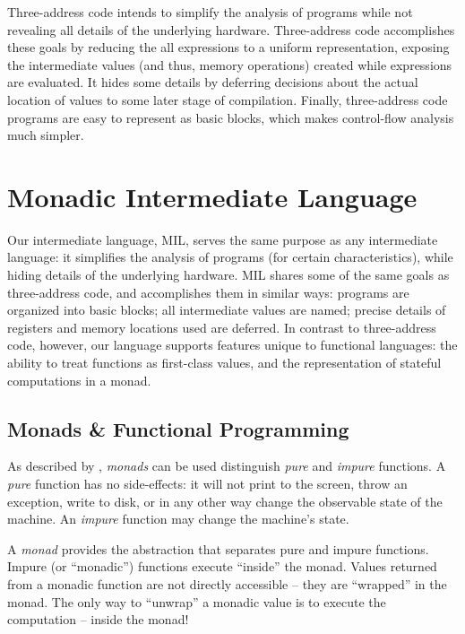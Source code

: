 \documentclass[12pt]{report}
\begin{document}
Three-address code intends to simplify the analysis of programs while
not revealing all details of the underlying hardware. Three-address
code accomplishes these goals by reducing the all expressions to a
uniform representation, exposing the intermediate values (and thus,
memory operations) created while expressions are evaluated. It hides
some details by deferring decisions about the actual location of
values to some later stage of compilation. Finally, three-address code
programs are easy to represent as basic blocks, which makes
control-flow analysis much simpler.

\section{Monadic Intermediate Language}
\label{mil_sec3}

Our intermediate language, MIL, serves the same purpose as any
intermediate language: it simplifies the analysis of programs (for
certain characteristics), while hiding details of the underlying
hardware. MIL shares some of the same goals as three-address code, and
accomplishes them in similar ways: programs are organized into basic
blocks; all intermediate values are named; precise details of
registers and memory locations used are deferred. In contrast to
three-address code, however, our language supports features unique to
functional languages: the ability to treat functions as first-class
values, and the representation of stateful computations in a monad.

\subsection*{Monads \& Functional Programming}
As described by \citet{Wadler1990}, \emph{monads} can be used
distinguish \emph{pure} and \emph{impure} functions. A \emph{pure}
function has no side-effects: it will not print to the screen, throw
an exception, write to disk, or in any other way change the observable
state of the machine. An \emph{impure} function may change the
machine's state.

A \emph{monad} provides the abstraction that separates pure and impure
functions. Impure (or ``monadic'') functions execute ``inside'' the
monad. Values returned from a monadic function are not directly
accessible -- they are ``wrapped'' in the monad. The only way
to ``unwrap'' a monadic value is to execute the computation -- inside
the monad! 
\end{document}
